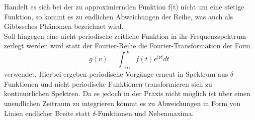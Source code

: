 Handelt es sich bei der zu approximiernden Funktion f(t) nicht um eine
stetige Funktion, so kommt es zu endlichen Abweichungen der Reihe,
was auch als Gibbssches Phänomen bezeichnet wird. \\
Soll hingegen eine nicht periodische zeitliche Funktion in ihr
Frequenzspektrum zerlegt werden wird statt der Fourier-Reihe die
Fourier-Transformation der Form
\begin{equation}
  g(v) = \int_{-\infty}^{\infty} f(t)e^{i\nu t} dt
\end{equation}
verwendet. Hierbei ergeben periodische Vorgänge erneut in Spektrum aus
$\delta$-Funktionen und nicht periodische Funktionen transformieren sich zu
kontinuirlichen
Spektren. Da es jedoch in der Praxis nicht möglich ist über einen unendlichen
Zeitraum zu integrieren kommt es zu Abweichungen in Form von Linien endlicher
Breite statt $\delta$-Funktionen und Nebenmaxima.
